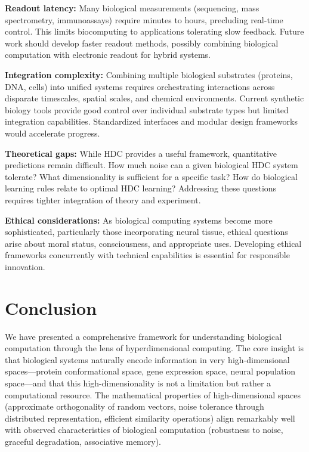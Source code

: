 \documentclass[12pt]{article}
\begin{document}
\textbf{Readout latency:} Many biological measurements (sequencing, mass spectrometry, immunoassays) require minutes to hours, precluding real-time control. This limits biocomputing to applications tolerating slow feedback. Future work should develop faster readout methods, possibly combining biological computation with electronic readout for hybrid systems.

\textbf{Integration complexity:} Combining multiple biological substrates (proteins, DNA, cells) into unified systems requires orchestrating interactions across disparate timescales, spatial scales, and chemical environments. Current synthetic biology tools provide good control over individual substrate types but limited integration capabilities. Standardized interfaces and modular design frameworks would accelerate progress.

\textbf{Theoretical gaps:} While HDC provides a useful framework, quantitative predictions remain difficult. How much noise can a given biological HDC system tolerate? What dimensionality is sufficient for a specific task? How do biological learning rules relate to optimal HDC learning? Addressing these questions requires tighter integration of theory and experiment.

\textbf{Ethical considerations:} As biological computing systems become more sophisticated, particularly those incorporating neural tissue, ethical questions arise about moral status, consciousness, and appropriate uses. Developing ethical frameworks concurrently with technical capabilities is essential for responsible innovation.

\section{Conclusion}

We have presented a comprehensive framework for understanding biological computation through the lens of hyperdimensional computing. The core insight is that biological systems naturally encode information in very high-dimensional spaces—protein conformational space, gene expression space, neural population space—and that this high-dimensionality is not a limitation but rather a computational resource. The mathematical properties of high-dimensional spaces (approximate orthogonality of random vectors, noise tolerance through distributed representation, efficient similarity operations) align remarkably well with observed characteristics of biological computation (robustness to noise, graceful degradation, associative memory).
\end{document}
